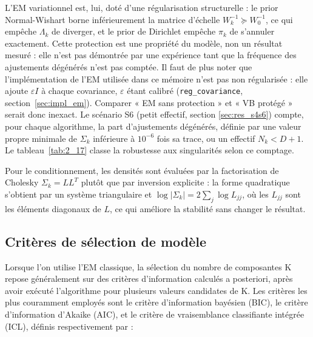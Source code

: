 L'EM variationnel est, lui, doté d'une régularisation structurelle : le prior Normal-Wishart borne inférieurement la matrice d'échelle $W_k^{-1} \succeq W_0^{-1}$, ce qui empêche $\Lambda_k$ de diverger, et le prior de Dirichlet empêche $\pi_k$ de s'annuler exactement. Cette protection est une propriété du modèle, non un résultat mesuré : elle n'est pas démontrée par une expérience tant que la fréquence des ajustements dégénérés n'est pas comptée. Il faut de plus noter que l'implémentation de l'EM utilisée dans ce mémoire n'est pas non régularisée : elle ajoute $\varepsilon I$ à chaque covariance, $\varepsilon$ étant calibré (\texttt{reg\_covariance}, section~\ref{sec:impl_em}). Comparer « EM sans protection » et « VB protégé » serait donc inexact. Le scénario S6 (petit effectif, section \ref{sec:res_s4s6}) compte, pour chaque algorithme, la part d'ajustements dégénérés, définie par une valeur propre minimale de $\Sigma_k$ inférieure à $10^{-6}$ fois sa trace, ou un effectif $N_k < D+1$. Le tableau~\ref{tab:2_17} classe la robustesse aux singularités selon ce comptage.

Pour le conditionnement, les densités sont évaluées par la factorisation de Cholesky $\Sigma _{k} = LL^{T}$ plutôt que par inversion explicite : la forme quadratique s'obtient par un système triangulaire et $\log |\Sigma _{k}| = 2\sum _{j}\log L_{jj}$, où les $L_{jj}$ sont les éléments diagonaux de $L$, ce qui améliore la stabilité sans changer le résultat.

\subsection{Critères de sélection de modèle}\label{sec:selection_modele}
Lorsque l'on utilise l'EM classique, la sélection du nombre de composantes K repose généralement sur des critères d'information calculés a posteriori, après avoir exécuté l'algorithme pour plusieurs valeurs candidates de K. Les critères les plus couramment employés sont le critère d'information bayésien (BIC), le critère d'information d'Akaike (AIC), et le critère de vraisemblance classifiante intégrée (ICL), définis respectivement par :

